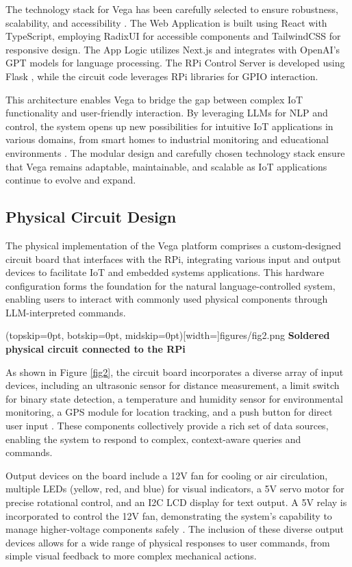 \documentclass{ieeeaccess}
\begin{document}
The technology stack for Vega has been carefully selected to ensure robustness, scalability, and accessibility \cite{math9040308}. The Web Application is built using React \cite{React2024} with TypeScript, employing RadixUI \cite{radix-ui} for accessible components and TailwindCSS \cite{tailwindcss} for responsive design. The App Logic utilizes Next.js \cite{NextJS} and integrates with OpenAI's GPT models \cite{OpenAI_GPT} for language processing. The RPi Control Server is developed using Flask \cite{Flask2024}, while the circuit code leverages RPi libraries for GPIO interaction.

This architecture enables Vega to bridge the gap between complex IoT functionality and user-friendly interaction. By leveraging LLMs for NLP and control, the system opens up new possibilities for intuitive IoT applications in various domains, from smart homes to industrial monitoring and educational environments \cite{8067944}. The modular design and carefully chosen technology stack ensure that Vega remains adaptable, maintainable, and scalable as IoT applications continue to evolve and expand.

\subsection{Physical Circuit Design}
The physical implementation of the Vega platform comprises a custom-designed circuit board that interfaces with the RPi, integrating various input and output devices to facilitate IoT and embedded systems applications. This hardware configuration forms the foundation for the natural language-controlled system, enabling users to interact with commonly used physical components  through LLM-interpreted commands.

\Figure[t!](topskip=0pt, botskip=0pt,
midskip=0pt)[width=\textwidth]{{figures/fig2.png}}
{ \textbf{Soldered physical circuit connected to the RPi }\label{fig2}}

As shown in Figure \ref{fig2}, the circuit board incorporates a diverse array of input devices, including an ultrasonic sensor for distance measurement, a limit switch for binary state detection, a temperature and humidity sensor for environmental monitoring, a GPS module for location tracking, and a push button for direct user input \cite{electronicwings_sensors_modules}. These components collectively provide a rich set of data sources, enabling the system to respond to complex, context-aware queries and commands.

Output devices on the board include a 12V fan for cooling or air circulation, multiple LEDs (yellow, red, and blue) for visual indicators, a 5V servo motor for precise rotational control, and an I2C LCD display for text output. A 5V relay is incorporated to control the 12V fan, demonstrating the system's capability to manage higher-voltage components safely \cite{smith2020}. The inclusion of these diverse output devices allows for a wide range of physical responses to user commands, from simple visual feedback to more complex mechanical actions.
\end{document}
